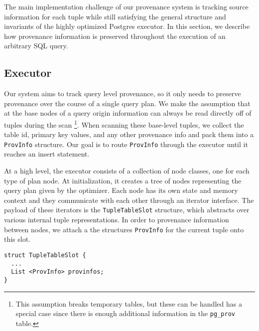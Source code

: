 
The main implementation challenge of our provenance system is tracking source information for each tuple while still satisfying the general structure and invariants of the highly optimized Postgres executor. In this section, we describe how provenance information is preserved throughout the execution of an arbitrary SQL query.

\subsection{Executor}

Our system aims to track query level provenance, so it only needs to preserve provenance over the course of a single query plan. We make the assumption that at the base nodes of a query origin information can always be read directly off of tuples during the scan \footnote{This assumption breaks temporary tables, but these can be handled has a special case since there is enough additional information in the \texttt{pg\_prov} table. }. When scanning these base-level tuples, we collect the table id, primary key values, and any other provenance info and pack them into a \texttt{ProvInfo} structure. Our goal is to route \texttt{ProvInfo} through the executor until it reaches an insert statement.

At a high level, the executor consists of a collection of node classes, one for each type of plan node. At initialization, it creates a tree of nodes representing the query plan given by the optimizer. Each node has its own state and memory context and they communicate with each other through an iterator interface. The payload of these iterators is the \texttt{TupleTableSlot} structure, which abstracts over various internal tuple representations. In order to provenance information between nodes, we attach a the structures \texttt{ProvInfo} for the current tuple onto this slot.

\begin{verbatim}
struct TupleTableSlot {
  ...
  List <ProvInfo> provinfos;
}
\end{verbatim}

